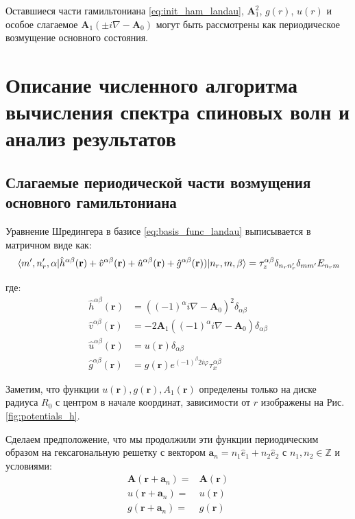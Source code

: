 \documentclass[a4paper,article,14pt]{extarticle}
\begin{document}
Оставшиеся части гамильтониана \eqref{eq:init_ham_landau}, $\mathbf{A}_1^2$, $g(r)$, $u(r)$ и особое слагаемое 
$\mathbf{A}_1  (\pm i \nabla - \mathbf{A}_0 )$ могут быть рассмотрены как периодическое возмущение основного состояния.



\pagebreak
\section{ Описание численного алгоритма вычисления спектра спиновых волн и анализ результатов  }


\subsection{Слагаемые периодической части возмущения основного гамильтониана}

Уравнение Шредингера в базисе \eqref{eq:basis_func_landau} выписывается в матричном виде как:
\begin{equation}
\label{eq:shred_final}
\mel{m', n'_r, \alpha}{\hat h^{\alpha \beta}(\mathbf{r}) + \hat v^{\alpha \beta}(\mathbf{r}) + \hat u^{\alpha \beta}(\mathbf{r}) + \hat g^{\alpha \beta} (\mathbf{r})) }{n_r,m, \beta} = {\tau_z^{\alpha \beta} \delta_{n_r n'_r} \delta_{m m'} E_{n_r m} }
\end{equation}

\noindent где:
\begin{equation}
\label{eq:definitions}
\begin{aligned}
\hat h^{\alpha \beta}(\mathbf{r})   &= \left( (-1)^\alpha i \nabla - \mathbf{A}_0 \right) ^ 2 \delta_{\alpha \beta} \\
\hat v^{\alpha \beta}(\mathbf{r})   &= - 2 \mathbf{A}_1 \left( (-1)^{\alpha} i \nabla - \mathbf{A}_0 \right) \delta_{\alpha \beta} \\
\hat u^{\alpha \beta}(\mathbf{r})   &= u(\mathbf{r})  \delta_{\alpha \beta}\\
\hat g^{\alpha \beta} (\mathbf{r}) &=   g(\mathbf{r})  e^{ (-1)^{\beta} 2  i   \varphi} \tau^{\alpha \beta}_x 
\end{aligned}
\end{equation}

Заметим, что функции $u(\mathbf{r}), g(\mathbf{r}), A_1(\mathbf{r})$ определены только на диске радиуса $R_0$ с центром в начале координат, зависимости от $r$ изображены на Рис. \ref{fig:potentials_h}.

Сделаем предположение, что мы продолжили эти функции периодическим образом на гексагональную решетку с вектором $\mathbf{a}_n = n_1 \hat {e}_1 + n_2 \hat {e}_2$ с $n_1,n_2 \in \mathbb{Z}$ и условиями:
\begin{equation}
\label{eq:periodic_potentials}
\begin{aligned}
\mathbf{A}(\mathbf{r} + \mathbf{a}_n) =& \mathbf{A}(\mathbf{r}) \\
u(\mathbf{r} + \mathbf{a}_n) =& u(\mathbf{r}) \\
g(\mathbf{r} + \mathbf{a}_n) =& g(\mathbf{r})
\end{aligned}
\end{equation}
\end{document}
